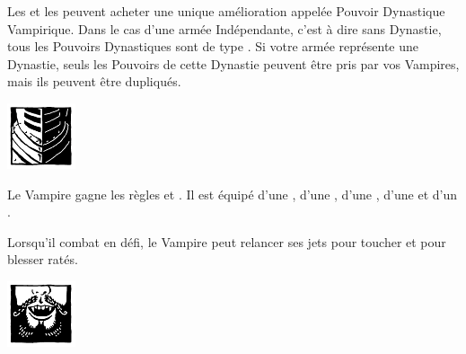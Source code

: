 \newpage
{}

\spaceaftersection{}

Les \vampirelords{} et les \vampireheroes{} peuvent acheter une unique amélioration appelée Pouvoir Dynastique Vampirique. Dans le cas d'une armée Indépendante, c'est à dire sans Dynastie, tous les Pouvoirs Dynastiques sont de type \oneofakind{}. Si votre armée représente une Dynastie, seuls les Pouvoirs de cette Dynastie peuvent être pris par vos Vampires, mais ils peuvent être dupliqués.

\begin{multicols}{2}\raggedcolumns

\begin{center}\includegraphics[width=2cm]{pics/logo_brotherhood.png}\end{center}
\vspace*{-1.2cm}

\startpricelist

 Le Vampire gagne les règles \weaponmaster{} et . Il est équipé d'une \pw{}, d'une \halberd{}, d'une \gw{}, d'une \lance{} et d'un \shield{}.

 Lorsqu'il combat en défi, le Vampire peut relancer ses jets pour toucher et pour blesser ratés.

\endpricelist

\begin{center}\includegraphics[width=2cm]{pics/logo_vonkarnstein.png}\end{center}
\vspace*{-1.2cm}

\startpricelist


\end{multicols}
